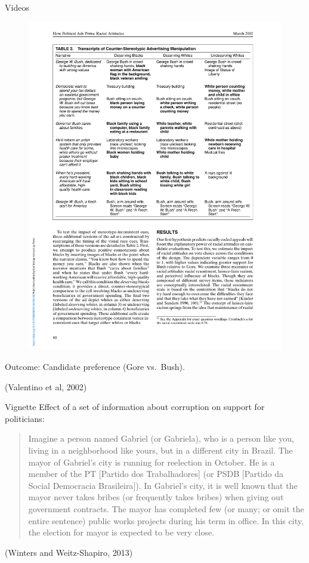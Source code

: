 \documentclass[
  ignorenonframetext,
]{beamer}
\begin{document}
\begin{frame}{Videos}
\protect\hypertarget{videos}{}
\begin{figure}

{\centering \includegraphics[width=0.65\linewidth]{./figs/survey-exp-valentino-2002} 

}

\end{figure}

Outcome: Candidate preference (Gore vs.~Bush).

(Valentino et al, 2002)
\end{frame}

\begin{frame}{Vignette}
\protect\hypertarget{vignette}{}
Effect of a set of information about corruption on support for
politicians:

\begin{quote}
Imagine a person named Gabriel (or Gabriela), who is a person like you,
living in a neighborhood like yours, but in a different city in Brazil.
The mayor of Gabriel's city is running for reelection in October. He is
a member of the PT {[}Partido dos Trabalhadores{]} (or PSDB {[}Partido
da Social Democracia Brasileira{]}). In Gabriel's city, it is well known
that the mayor never takes bribes (or frequently takes bribes) when
giving out government contracts. The mayor has completed few (or many;
or omit the entire sentence) public works projects during his term in
office. In this city, the election for mayor is expected to be very
close.
\end{quote}

(Winters and Weitz-Shapiro, 2013)
\end{frame}
\end{document}
